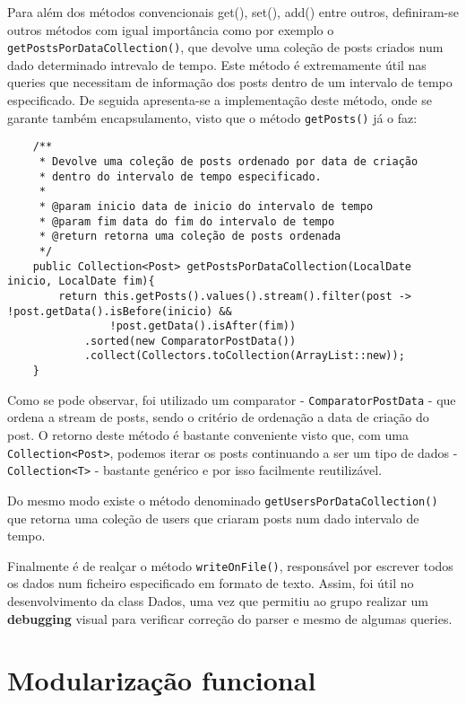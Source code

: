 \documentclass[11pt,a4paper]{article}
\begin{document}
Para além dos métodos convencionais get(), set(), add() entre outros, definiram-se outros métodos com igual importância como por exemplo o \texttt{getPostsPorDataCollection()},
que devolve uma coleção de posts criados num dado determinado intrevalo de tempo.
Este método é extremamente útil nas queries que necessitam de informação dos posts dentro de um intervalo de tempo especificado.
 De seguida apresenta-se a implementação deste método, onde se garante também encapsulamento, visto que o método \texttt{getPosts()} já o faz:

\begingroup
    \fontsize{8pt}{12pt}\selectfont
    \begin{verbatim}
    /**
     * Devolve uma coleção de posts ordenado por data de criação
     * dentro do intervalo de tempo especificado.
     *
     * @param inicio data de inicio do intervalo de tempo
     * @param fim data do fim do intervalo de tempo
     * @return retorna uma coleção de posts ordenada
     */
    public Collection<Post> getPostsPorDataCollection(LocalDate inicio, LocalDate fim){
        return this.getPosts().values().stream().filter(post -> !post.getData().isBefore(inicio) &&
                !post.getData().isAfter(fim))
            .sorted(new ComparatorPostData())
            .collect(Collectors.toCollection(ArrayList::new));
    }
    \end{verbatim}
\endgroup

Como se pode observar, foi utilizado um comparator - \texttt{ComparatorPostData} - que ordena a stream de posts, sendo o critério de ordenação a data de criação do post.
O retorno deste método é bastante conveniente visto que, com uma \texttt{Collection<Post>}, podemos iterar os posts continuando
a ser um tipo de dados - \texttt{Collection<T>} -  bastante genérico e por isso facilmente reutilizável.\newline

Do mesmo modo existe o método denominado \texttt{getUsersPorDataCollection()} que retorna uma coleção de users que criaram posts num dado intervalo de tempo.\newline

Finalmente é de realçar o método \texttt{writeOnFile()}, responsável por escrever todos os dados num ficheiro especificado em formato
 de texto. Assim, foi útil no desenvolvimento da class Dados, uma vez que
permitiu ao grupo realizar um \textbf{debugging} visual para verificar correção do parser e mesmo de algumas
queries.


\newpage
\section{Modularização funcional}
\end{document}
